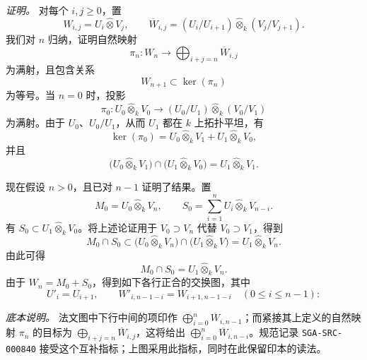 
\noindent\textit{证明。}
对每个 \(i,j\geq0\)，置
\[
  W_{i,j}=U_i\widehat\otimes V_j,
  \qquad
  \overline W_{i,j}
  =
  (U_i/U_{i+1})\widehat\otimes_k(V_j/V_{j+1}).
\]
我们对 \(n\) 归纳，证明自然映射
\[
  \pi_n:W_n\longrightarrow
  \bigoplus_{i+j=n}\overline W_{i,j}
\]
为满射，且包含关系
\[
  W_{n+1}\subset\ker(\pi_n)
\]
为等号。当 \(n=0\) 时，投影
\[
  \pi_0:
  U_0\widehat\otimes_kV_0
  \longrightarrow
  (U_0/U_1)\widehat\otimes_k(V_0/V_1)
\]
为满射。由于 \(U_0\)、\(U_0/U_1\)，从而 \(U_1\) 都在 \(k\) 上拓扑平坦，有
\[
  \ker(\pi_0)
  =
  U_0\widehat\otimes_kV_1
  +
  U_1\widehat\otimes_kV_0,
\]
并且
\[
  \bigl(U_0\widehat\otimes_kV_1\bigr)
  \cap
  \bigl(U_1\widehat\otimes_kV_0\bigr)
  =
  U_1\widehat\otimes_kV_1.
\]

现在假设 \(n>0\)，且已对 \(n-1\) 证明了结果。置
\[
  M_0=U_0\widehat\otimes_kV_n,
  \qquad
  S_0=\sum_{i=1}^{n}U_i\widehat\otimes_kV_{n-i}.
\]
有 \(S_0\subset U_1\widehat\otimes_kV_0\)。将上述论证用于 \(V_0\supset V_n\) 代替 \(V_0\supset V_1\)，得到
\[
  M_0\cap S_0
  \subset
  \bigl(U_0\widehat\otimes_kV_n\bigr)
  \cap
  \bigl(U_1\widehat\otimes_kV\bigr)
  =
  U_1\widehat\otimes_kV_n.
\]
由此可得
\[
  M_0\cap S_0=U_1\widehat\otimes_kV_n.
\]
由于 \(W_n=M_0+S_0\)，得到如下各行正合的交换图，其中
\[
  U'_i=U_{i+1},
  \qquad
  W'_{i,n-1-i}=W_{i+1,n-1-i}
  \quad(0\leq i\leq n-1):
\]
\begin{center}
  \label{sga3:VIIB:5.1.2:filtration-exact-rows-diagram}
  
\end{center}

\label{sga3:VIIB:5.1.2:diagram-source-notation-note}
\noindent\textit{底本说明。}\enspace
法文图中下行中间的项印作 \(\bigoplus_{i=0}^{n}\overline W_{i,n-1}\)；而紧接其上定义的自然映射 \(\pi_n\) 的目标为 \(\bigoplus_{i+j=n}\overline W_{i,j}\)，这将给出 \(\bigoplus_{i=0}^{n}\overline W_{i,n-i}\)。规范记录 \texttt{SGA-SRC-000840} 接受这个互补指标；上图采用此指标，同时在此保留印本的读法。

